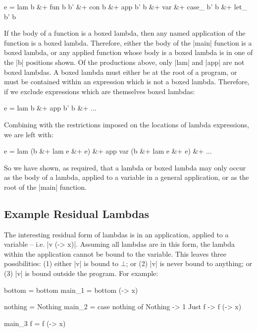 \ignore\begin{code}
e =  lam b &+ fun b b' &+ con b &+ app b' b &+
     var &+ case_ b' b &+ let_ b' b
\end{code}

If the body of a function is a boxed lambda, then any named application of the function is a boxed lambda. Therefore, either the body of the |main| function is a boxed lambda, or any applied function whose body is a boxed lambda is in one of the |b| positions shown. Of the productions above, only |lam| and |app| are not boxed lambdas. A boxed lambda must either be at the root of a program, or must be contained within an expression which is not a boxed lambda. Therefore, if we exclude expressions which are themselves boxed lambdas:

\ignore\begin{code}
e = lam b &+ app b' b &+ ...
\end{code}

Combining with the restrictions imposed on the locations of lambda expressions, we are left with:

\ignore\begin{code}
e   = lam (b &+ lam e &+ e) &+ app var (b &+ lam e &+ e) &+ ...
\end{code}

So we have shown, as required, that a lambda or boxed lambda may only occur as the body of a lambda, applied to a variable in a general application, or as the root of the |main| function.

\subsection{Example Residual Lambdas}

The interesting residual form of lambdas is in an application, applied to a variable -- i.e. |v (\x -> x)|. Assuming all lambdas are in this form, the lambda within the application cannot be bound to the variable. This leaves three possibilities: (1) either |v| is bound to $\bot{}$; or (2) |v| is never bound to anything; or (3) |v| is bound outside the program. For example:

\begin{code}
bottom = bottom
main_1 = bottom (\x -> x)

nothing = Nothing
main_2 = case  nothing of
               Nothing  -> 1
               Just f   -> f (\x -> x)

main_3 f = f (\x -> x)
\end{code}

